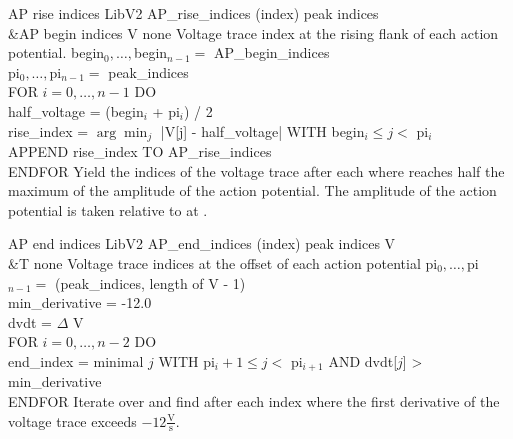 \begin{efeature}
  {AP rise indices}
  {LibV2}
  {AP\_rise\_indices}
  {(index)}
  {peak indices\\&AP begin indices}
  {V}
  {none}
  {Voltage trace index at the rising flank of each action potential.}
  {
  begin$_0, \ldots, $begin$_{n-1} =$ AP\_begin\_indices \\
  pi$_0, \ldots, $pi$_{n-1} =$ peak\_indices \\
  FOR $i = 0, \dots, n - 1$ DO \+ \\
    half\_voltage = (begin$_i$ + pi$_i$) / 2 \\
    rise\_index = $\arg\min_j$ |V[j] - half\_voltage| WITH begin$_i \le j <$ pi$_i$ \\
    APPEND rise\_index TO AP\_rise\_indices \- \\
  ENDFOR
  }
  Yield the indices of the voltage trace after each  where  reaches half the maximum of the amplitude of the action potential.
  The amplitude of the action potential is taken relative to  at .
  
\end{efeature}

\begin{efeature}
  {AP end indices}
  {LibV2}
  {AP\_end\_indices}
  {(index)}
  {peak indices}
  {V\\&T}
  {none}
  {Voltage trace indices at the offset of each action potential}
  {
  pi$_0, \ldots, $pi$_{n-1} =$ (peak\_indices, length of V - 1) \\
  min\_derivative = -12.0 \\
  dvdt = $\Delta$ V \\
  FOR $i = 0, \dots, n - 2$ DO \+ \\
    end\_index = minimal $j$ WITH pi$_i + 1 \le j <$ pi$_{i+1}$ AND dvdt[$j$] > min\_derivative \- \\
  ENDFOR
  }
  Iterate over  and find after each index where the first derivative of the voltage trace exceeds $-12 \frac{\mathrm{V}}{\mathrm{s}}$.
  
\end{efeature}

